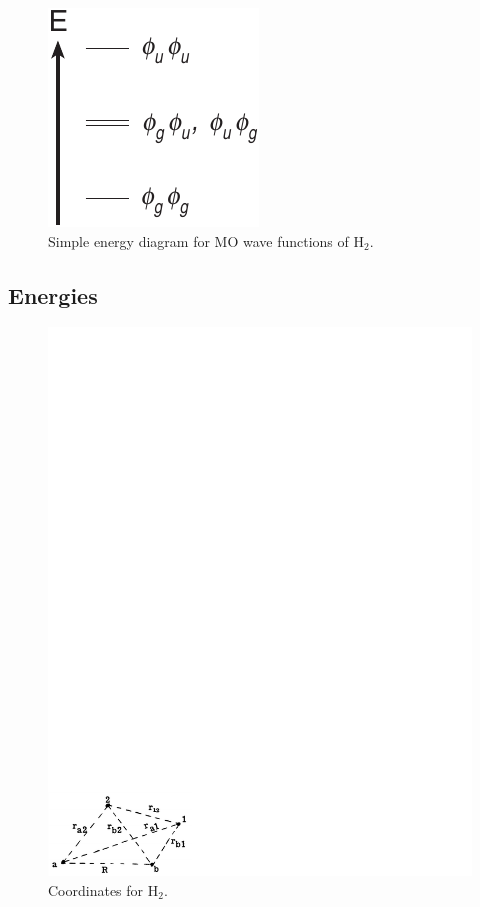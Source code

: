 \begin{figure}
\begin{center}
\includegraphics[scale=0.75]{fig2-16}
\end{center}
\caption{Simple energy diagram for MO wave functions of H$_2$.}
\label{fig2-16}
\end{figure}

\subsection{Energies}
    
\begin{figure}
\begin{center}
\includegraphics[scale=0.75]{fig2-17}
\end{center}
\caption{Coordinates for H$_2$.}
\label{fig2-17}
\end{figure}
    
